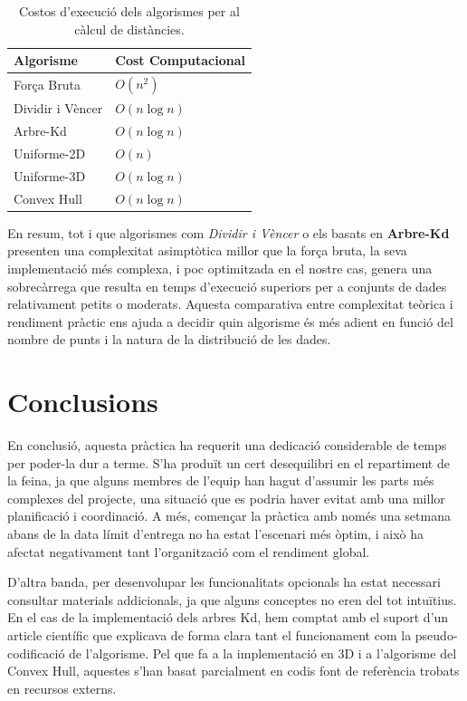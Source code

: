 \documentclass{ieeetj}
\begin{document}
\begin{table}[h]
    \centering
    \begin{tabular}{|l|l|}
        \hline
        \textbf{Algorisme} & \textbf{Cost Computacional} \\
        \hline
        Força Bruta         & \(O(n^2)\)       \\
        Dividir i Vèncer    & \(O(n\log n)\)   \\
        Arbre-Kd            & \(O(n\log n)\)   \\
        Uniforme-2D         & \(O(n)\)         \\
        Uniforme-3D         & \(O(n\log n)\)   \\
        Convex Hull         & \(O(n\log n)\)   \\
        \hline
    \end{tabular}
    \vspace{3mm}
    \caption{Costos d'execució dels algorismes per al càlcul de distàncies.}
    \label{tab:complexitat}
\end{table}

\bigskip

\noindent En resum, tot i que algorismes com \textit{Dividir i Vèncer} o els basats en \textbf{Arbre-Kd} presenten una complexitat asimptòtica millor que la força bruta, la seva implementació més complexa, i poc optimitzada en el nostre cas,  genera una sobrecàrrega que resulta en temps d'execució superiors per a conjunts de dades relativament petits o moderats. Aquesta comparativa entre complexitat teòrica i rendiment pràctic ens ajuda a decidir quin algorisme és més adient en funció del nombre de punts i la natura de la distribució de les dades.



\section{Conclusions}
En conclusió, aquesta pràctica ha requerit una dedicació considerable de temps per poder-la dur a terme. S’ha produït un cert desequilibri en el repartiment de la feina, ja que alguns membres de l’equip han hagut d’assumir les parts més complexes del projecte, una situació que es podria haver evitat amb una millor planificació i coordinació. A més, començar la pràctica amb només una setmana abans de la data límit d'entrega no ha estat l’escenari més òptim, i això ha afectat negativament tant l’organització com el rendiment global.

D’altra banda, per desenvolupar les funcionalitats opcionals ha estat necessari consultar materials addicionals, ja que alguns conceptes no eren del tot intuïtius. En el cas de la implementació dels arbres Kd, hem comptat amb el suport d’un article científic que explicava de forma clara tant el funcionament com la pseudo-codificació de l’algorisme. Pel que fa a la implementació en 3D i a l’algorisme del Convex Hull, aquestes s’han basat parcialment en codis font de referència trobats en recursos externs.
\end{document}
